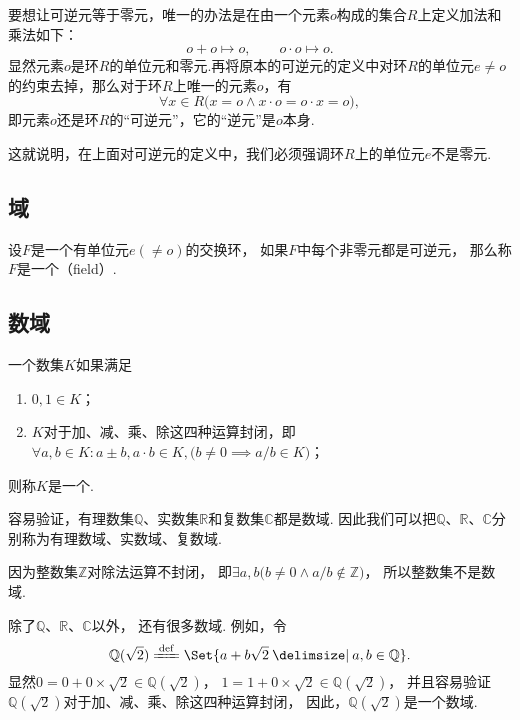 \begin{example}
要想让可逆元等于零元，唯一的办法是在由一个元素\(o\)构成的集合\(R\)上定义加法和乘法如下：\[
o + o \mapsto o,
\qquad
o \cdot o \mapsto o.
\]显然元素\(o\)是环\(R\)的单位元和零元.再将原本的可逆元的定义中对环\(R\)的单位元\(e \neq o\)的约束去掉，那么对于环\(R\)上唯一的元素\(o\)，有\[
\forall x \in R \bigl( x = o \land x \cdot o = o \cdot x = o \bigr),
\]即元素\(o\)还是环\(R\)的“可逆元”，它的“逆元”是\(o\)本身.

这就说明，在上面对可逆元的定义中，我们必须强调环\(R\)上的单位元\(e\)不是零元.
\end{example}

\subsection{域}
\begin{definition}
设\(F\)是一个有单位元\(e(\neq o)\)的交换环，%
如果\(F\)中每个非零元都是可逆元，%
那么称\(F\)是一个（field）.
\end{definition}

\subsection{数域}
\begin{definition}
一个数集\(K\)如果满足\begin{enumerate}
\item \(0,1 \in K\)；
\item \(K\)对于加、减、乘、除这四种运算封闭，即%
\(\forall a,b \in K :
a \pm b,
a \cdot b \in K,
\bigl( b \neq 0 \implies a/b \in K \bigr)
\)；
\end{enumerate}
则称\(K\)是一个.
\end{definition}
容易验证，有理数集\(\mathbb{Q}\)、实数集\(\mathbb{R}\)和复数集\(\mathbb{C}\)都是数域.
因此我们可以把\(\mathbb{Q}\)、\(\mathbb{R}\)、\(\mathbb{C}\)分别称为有理数域、实数域、复数域.

因为整数集\(\mathbb{Z}\)对除法运算不封闭，%
即\(\exists a, b \bigl( b \neq 0 \land a/b \notin \mathbb{Z} \bigr)\)，%
所以整数集不是数域.

除了\(\mathbb{Q}\)、\(\mathbb{R}\)、\(\mathbb{C}\)以外，%
还有很多数域.
例如，令{\def\Q{\mathbb{Q}(\sqrt{2})}%
\[
\Q
\defeq
\Set{ a + b \sqrt{2} \given a,b \in \mathbb{Q} }.
\]
显然\(0=0+0\times\sqrt{2}\in\Q\)，%
\(1=1+0\times\sqrt{2}\in\Q\)，%
并且容易验证\(\Q\)对于加、减、乘、除这四种运算封闭，%
因此，\(\Q\)是一个数域.
}%

